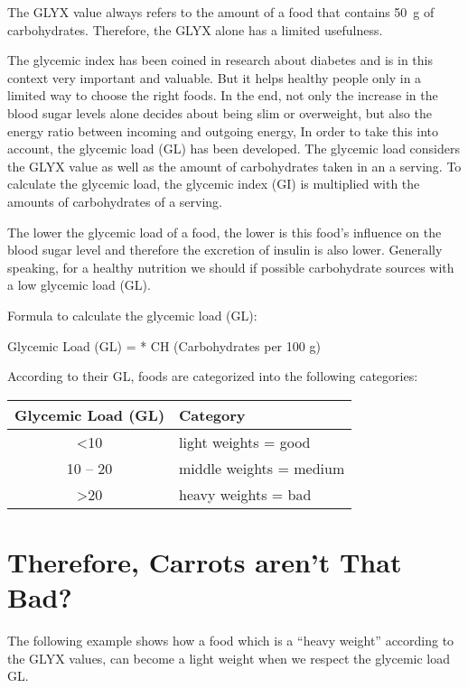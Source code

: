 \documentclass[../main.tex]{subfiles}
\begin{document}
The GLYX value always refers to the amount of a food that contains \SI{50}{\g} of carbohydrates.
Therefore, the GLYX alone has a limited usefulness.

The glycemic index has been coined in research about diabetes and is in this context very important and valuable.
But it helps healthy people only in a limited way   to choose the right foods.
In the end, not only the increase in the blood sugar levels alone decides about being slim or overweight,
but also the energy ratio between incoming and outgoing energy,
In order to take this into account, the glycemic load (GL) has been developed.
The glycemic load considers  the GLYX value as well as the amount of carbohydrates taken in an a serving.
To calculate the glycemic load, the glycemic index (GI) is multiplied with the amounts of carbohydrates of a serving.

The lower the glycemic load of a food, the lower is this food's influence on the blood sugar level and
therefore the excretion of insulin is also lower.
Generally speaking, for a healthy nutrition we should if possible carbohydrate sources with a low glycemic load (GL).

Formula to calculate the glycemic load (GL):

\begin{center}
  Glycemic Load (GL) =  * CH (Carbohydrates per 100 g)
  \end{center}

According to their GL, foods are categorized into the following categories:

\begin{center}
  \begin{tabular}{cl}
    \textbf{Glycemic Load (GL)} & \textbf{Category} \\
    \hline
    \textless 10 & light weights = good \\
    10 -- 20 & middle weights = medium \\
    \textgreater 20 & heavy weights = bad \\
  \end{tabular}
\end{center}

\section{Therefore, Carrots aren't That Bad?}

The following example shows how a food which is a ``heavy weight'' according to the GLYX values, can become a light weight when we respect the glycemic load GL.
\end{document}
